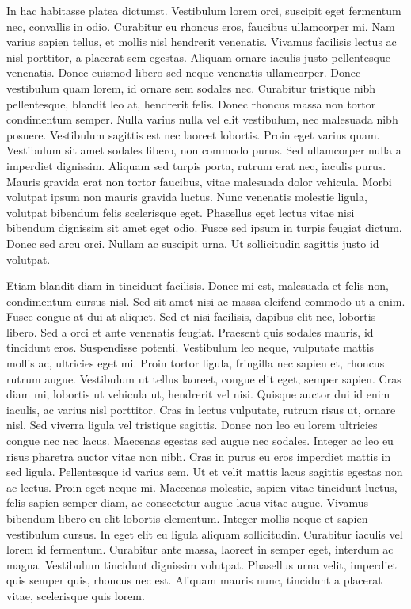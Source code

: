 \documentclass[a4paper, 12pt, twoside]{book}
\begin{document}
In hac habitasse platea dictumst. Vestibulum lorem orci, suscipit eget fermentum nec, convallis in odio. Curabitur eu rhoncus eros, faucibus ullamcorper mi. Nam varius sapien tellus, et mollis nisl hendrerit venenatis. Vivamus facilisis lectus ac nisl porttitor, a placerat sem egestas. Aliquam ornare iaculis justo pellentesque venenatis. Donec euismod libero sed neque venenatis ullamcorper. Donec vestibulum quam lorem, id ornare sem sodales nec. Curabitur tristique nibh pellentesque, blandit leo at, hendrerit felis. Donec rhoncus massa non tortor condimentum semper. Nulla varius nulla vel elit vestibulum, nec malesuada nibh posuere. Vestibulum sagittis est nec laoreet lobortis. Proin eget varius quam. Vestibulum sit amet sodales libero, non commodo purus. Sed ullamcorper nulla a imperdiet dignissim. Aliquam sed turpis porta, rutrum erat nec, iaculis purus. Mauris gravida erat non tortor faucibus, vitae malesuada dolor vehicula. Morbi volutpat ipsum non mauris gravida luctus. Nunc venenatis molestie ligula, volutpat bibendum felis scelerisque eget. Phasellus eget lectus vitae nisi bibendum dignissim sit amet eget odio. Fusce sed ipsum in turpis feugiat dictum. Donec sed arcu orci. Nullam ac suscipit urna. Ut sollicitudin sagittis justo id volutpat.


Etiam blandit diam in tincidunt facilisis. Donec mi est, malesuada et felis non, condimentum cursus nisl. Sed sit amet nisi ac massa eleifend commodo ut a enim. Fusce congue at dui at aliquet. Sed et nisi facilisis, dapibus elit nec, lobortis libero. Sed a orci et ante venenatis feugiat. Praesent quis sodales mauris, id tincidunt eros. Suspendisse potenti. Vestibulum leo neque, vulputate mattis mollis ac, ultricies eget mi. Proin tortor ligula, fringilla nec sapien et, rhoncus rutrum augue. Vestibulum ut tellus laoreet, congue elit eget, semper sapien. Cras diam mi, lobortis ut vehicula ut, hendrerit vel nisi. Quisque auctor dui id enim iaculis, ac varius nisl porttitor. Cras in lectus vulputate, rutrum risus ut, ornare nisl. Sed viverra ligula vel tristique sagittis. Donec non leo eu lorem ultricies congue nec nec lacus. Maecenas egestas sed augue nec sodales. Integer ac leo eu risus pharetra auctor vitae non nibh. Cras in purus eu eros imperdiet mattis in sed ligula. Pellentesque id varius sem. Ut et velit mattis lacus sagittis egestas non ac lectus. Proin eget neque mi. Maecenas molestie, sapien vitae tincidunt luctus, felis sapien semper diam, ac consectetur augue lacus vitae augue. Vivamus bibendum libero eu elit lobortis elementum. Integer mollis neque et sapien vestibulum cursus. In eget elit eu ligula aliquam sollicitudin. Curabitur iaculis vel lorem id fermentum. Curabitur ante massa, laoreet in semper eget, interdum ac magna. Vestibulum tincidunt dignissim volutpat. Phasellus urna velit, imperdiet quis semper quis, rhoncus nec est. Aliquam mauris nunc, tincidunt a placerat vitae, scelerisque quis lorem.
\end{document}
